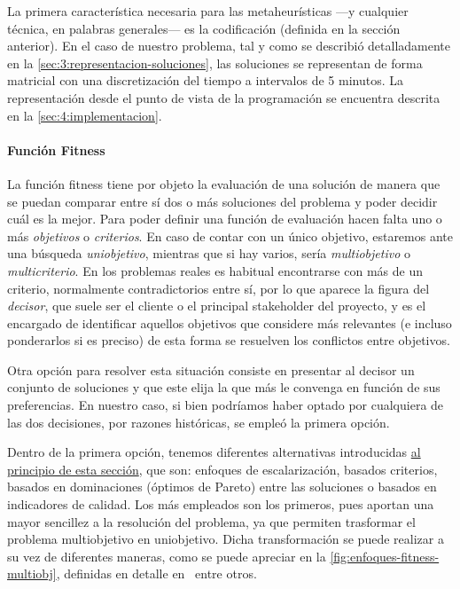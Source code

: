 La primera característica necesaria para las metaheurísticas ---y cualquier técnica, en palabras generales--- es la codificación (definida en la sección anterior). En el caso de nuestro problema, tal y como se describió detalladamente en la \autoref{sec:3:representacion-soluciones}, las soluciones se representan de forma matricial con una discretización del tiempo a intervalos de 5 minutos. La representación desde el punto de vista de la programación se encuentra descrita en la \autoref{sec:4:implementacion}. %




\paragraph{Función Fitness} \label{apartado:adaptacion-fitness}

La función fitness tiene por objeto la evaluación de una solución de manera que se puedan comparar entre sí dos o más soluciones del problema y poder decidir cuál es la mejor. Para poder definir una función de evaluación hacen falta uno o más \textit{objetivos} o \textit{criterios}. En caso de contar con un único objetivo, estaremos ante una búsqueda \textit{uniobjetivo}, mientras que si hay varios, sería \textit{multiobjetivo} o \textit{multicriterio}. En los problemas reales es habitual encontrarse con más de un criterio, normalmente contradictorios entre sí, por lo que aparece la figura del \textit{decisor}, que suele ser el cliente o el principal stakeholder del proyecto, y es el encargado de identificar aquellos objetivos que considere más relevantes (e incluso ponderarlos si es preciso) de esta forma se resuelven los conflictos entre objetivos. 

Otra opción para resolver esta situación consiste en presentar al decisor un conjunto de soluciones y que este elija la que más le convenga en función de sus preferencias. En nuestro caso, si bien podríamos haber optado por cualquiera de las dos decisiones, por razones históricas, se empleó la primera opción.

Dentro de la primera opción, tenemos diferentes alternativas introducidas \hyperref[sec:3:metaheurística]{al principio de esta sección}, que son: enfoques de escalarización, basados criterios, basados en dominaciones (óptimos de Pareto) entre las soluciones o basados en indicadores de calidad. Los más empleados son los primeros, pues aportan una mayor sencillez a la resolución del problema, ya que permiten trasformar el problema multiobjetivo en uniobjetivo. Dicha transformación se puede realizar a su vez de diferentes maneras, como se puede apreciar en la \autoref{fig:enfoques-fitness-multiobj}, definidas en detalle en~\cite{sota:metaheuristicas-design-impl} entre otros.

